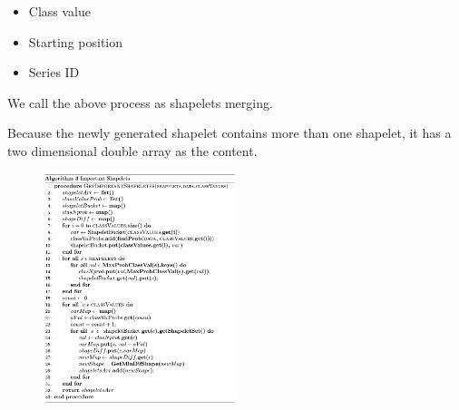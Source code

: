 \documentclass[conference]{IEEEtran}  %
\begin{document}


\begin{itemize}
\item Class value
\item Starting position
\item Series ID
\end{itemize}
We call the above process as shapelets merging.

Because the newly generated shapelet contains more than one shapelet, it has a two dimensional double array as the content. 

\begin{figure}
\includegraphics[width=0.5\textwidth]{algo3.png}
\label{algo3}
\end{figure}
\end{document}
